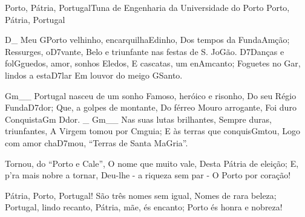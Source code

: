 \begin{musica}{Porto, Pátria, Portugal}{Tuna de Engenharia da Universidade do Porto}{}
 Porto, Pátria, Portugal

\ac{D}{}_ Meu \ac{G}{Por}to velhinho, encarquilha\ac{E}{di}nho,
Dos tempos da Funda\ac{Am}{ção};
Ressurges, o\ac{D7}{van}te,
Belo e triunfante nas festas de S. Jo\ac{G}{ão}.
\ac{D7}{Dan}ças e fol\ac{G}{gue}dos, amor, sonhos \ac{E}{le}dos,
E cascatas, um en\ac{Am}{can}to;
Foguetes no \ac{G}{ar}, lindos a esta\ac{D7}{lar}
Em louvor do meigo \ac{G}{San}to.

\ac{Gm}{}__ Portugal nasceu de um sonho
Famoso, heróico e risonho,
Do seu Régio Funda\ac{D7}{dor};
Que, a golpes de montante,
Do férreo Mouro arrogante,
Foi duro Conquista\ac{Gm D}{dor}. _
\ac{Gm}{}__ Nas suas lutas brilhantes,
Sempre duras, triunfantes,
A Virgem tomou por \ac{Cm}{guia};
E às terras que conquis\ac{Gm}{tou},
Logo com amor cha\ac{D7}{mou},
“Terras de Santa Ma\ac{G}{ria}”.

Tornou, do “Porto e Cale”,
O nome que muito vale,
Desta Pátria de eleição;
E, p’ra mais nobre a tornar,
Deu-lhe - a riqueza sem par -
O Porto por coração!

Pátria, Porto, Portugal!
São três nomes sem igual,
Nomes de rara beleza;
Portugal, lindo recanto,
Pátria, mãe, és encanto;
Porto és honra e nobreza!

\end{musica}
